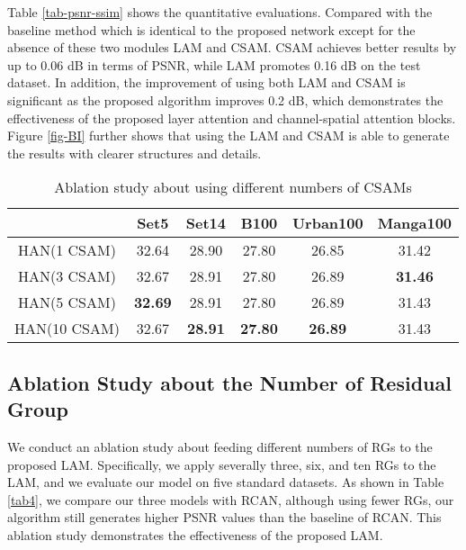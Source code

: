 \documentclass[runningheads]{llncs}
\begin{document}
Table \ref{tab-psnr-ssim} shows the quantitative evaluations. Compared with the baseline method which is identical to the proposed network except for the absence of these two modules LAM and CSAM. CSAM achieves better results by up to 0.06 dB in terms of PSNR, while LAM promotes 0.16 dB on the test dataset. In addition, the improvement of using both LAM and CSAM is significant as the proposed algorithm improves 0.2 dB, which demonstrates the effectiveness of the proposed layer attention and channel-spatial attention blocks. 
Figure \ref{fig-BI} further shows that using the LAM and CSAM is able to
generate the results with clearer structures and details.


\begin{table}[!t]
	\tabcolsep 8pt
	\caption{Ablation study about using different numbers of CSAMs}
	
	\begin{center}\scriptsize{
			\begin{tabular}{cccccc}
				\toprule
				&Set5 & Set14 & B100 & Urban100 & Manga100 \\
				\midrule
				HAN(1 CSAM)       &32.64  & 28.90   & 27.80  & 26.85  &31.42   \\
				HAN(3 CSAM)       &32.67 & 28.91   & 27.80  & 26.89  &\textbf{31.46}   \\
				HAN(5 CSAM)       &\textbf{32.69}  & 28.91   & 27.80  & 26.89  &31.43   \\
				HAN(10 CSAM)      &32.67  & \textbf{28.91}   & \textbf{27.80}  & \textbf{26.89} &31.43  \\
				\bottomrule
		\end{tabular}}
		\label{tabR2}
	\end{center}
	
\end{table}

\subsection{Ablation Study about the Number of Residual Group}
We conduct an ablation study about feeding different numbers of RGs to the proposed LAM. Specifically, we apply severally three, six, and ten RGs to the LAM, and we evaluate our model on five standard datasets. As shown in Table \ref{tab4}, we compare our three models with RCAN, although using fewer RGs, our algorithm still generates higher PSNR values than the baseline of RCAN. This ablation study demonstrates the effectiveness of the proposed LAM.
\end{document}

